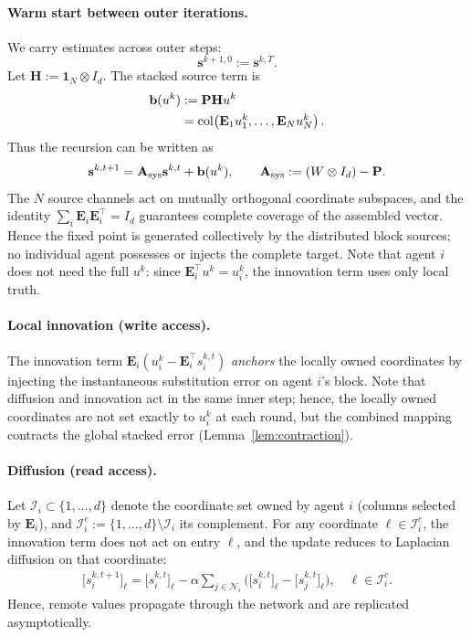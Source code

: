 \documentclass[letterpaper, 10 pt, conference]{ieeeconf} %
\DeclareMathOperator{\col}{col}
\begin{document}
\paragraph{Warm start between outer iterations.}
We carry estimates across outer steps:
\begin{equation}\label{eq:warmstart}
\mathbf{s}^{k+1,0}:=\mathbf{s}^{k,T}.
\end{equation}
Let \(\mathbf H:=\mathbf 1_N\otimes I_d\). The stacked source term is
\begin{align}
\mathbf b(u^k)
&:=\mathbf P\mathbf H u^k \notag\\
&=
\col\!\left(
\mathbf E_1u_1^k,\ldots,\mathbf E_Nu_N^k
\right).
\end{align}
Thus the recursion can be written as
\begin{align}
\mathbf s^{k,t+1}
=
\mathbf A_{\rm sys}\mathbf s^{k,t}
+\mathbf b(u^k),
\qquad
\mathbf A_{\rm sys}
:=
(W\otimes I_d)-\mathbf P.
\end{align}
The \(N\) source channels act on mutually orthogonal coordinate subspaces, and the identity \(\sum_i\mathbf E_i\mathbf E_i^\top=I_d\) guarantees complete coverage of the assembled vector. Hence the fixed point is generated collectively by the distributed block sources; no individual agent possesses or injects the complete target. Note that agent $i$ does not need the full $u^{k}$: since $\mathbf{E}_i^\top u^{k}=u_i^{k}$, the innovation term uses only local truth.

\paragraph{Local innovation (write access).}
The innovation term $\mathbf{E}_i(u_i^k-\mathbf{E}_i^\top s_i^{k,t})$ \emph{anchors} the locally owned coordinates by injecting the instantaneous substitution error on agent $i$'s block. Note that diffusion and innovation act in the same inner step; hence, the locally owned coordinates are not set exactly to $u_i^k$ at each round, but the combined mapping contracts the global stacked error (Lemma~\ref{lem:contraction}).

\paragraph{Diffusion (read access).}
Let $\mathcal I_i\subset\{1,\dots,d\}$ denote the coordinate set owned by agent $i$ (columns selected by $\mathbf{E}_i$), and $\mathcal I_i^c:=\{1,\dots,d\}\setminus\mathcal I_i$ its complement. For any coordinate $\ell\in\mathcal I_i^c$, the innovation term does not act on entry $\ell$, and the update reduces to Laplacian diffusion on that coordinate:
\begin{align}
\big[s_i^{k,t+1}\big]_\ell
=
\big[s_i^{k,t}\big]_\ell
-\alpha \sum_{j\in\mathcal N_i}\Big(\big[s_i^{k,t}\big]_\ell-\big[s_j^{k,t}\big]_\ell\Big),
\quad \ell\in\mathcal I_i^c.
\end{align}
Hence, remote values propagate through the network and are replicated asymptotically.
\end{document}
